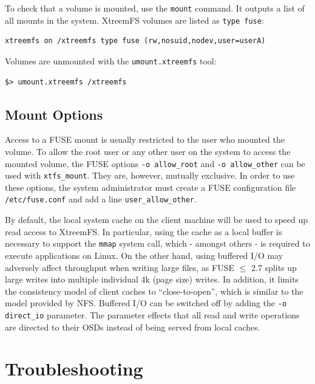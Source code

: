 \documentclass[a4paper,10pt]{book}
\begin{document}
To check that a volume is mounted, use the \texttt{mount} command. It outputs a list of all mounts in the system. XtreemFS volumes are listed as \texttt{type fuse}:

\begin{verbatim}
xtreemfs on /xtreemfs type fuse (rw,nosuid,nodev,user=userA)
\end{verbatim}

Volumes are unmounted with the \texttt{umount.xtreemfs} tool:

\begin{verbatim}
$> umount.xtreemfs /xtreemfs
\end{verbatim}

\subsection{Mount Options}

Access to a FUSE mount is usually restricted to the user who mounted the volume. To allow the root user or any other user on the system to access the mounted volume, the FUSE options \texttt{-o allow\_root} and \texttt{-o allow\_other} can be used with \texttt{xtfs\_mount}. They are, however, mutually exclusive. In order to use these options, the system administrator must create a FUSE configuration file \texttt{/etc/fuse.conf} and add a line \texttt{user\_allow\_other}.

By default, the local system cache on the client machine will be used to speed up read access to XtreemFS. In particular, using the cache as a local buffer is necessary to support the \texttt{mmap} system call, which - amongst others - is required to execute applications on Linux. On the other hand, using buffered I/O may adversely affect throughput when writing large files, as FUSE $\leq$ 2.7 splits up large writes into multiple individual 4k (page size) writes. In addition, it limits the consistency model of client caches to ``close-to-open'', which is similar to the model provided by NFS. Buffered I/O can be switched off by adding the \texttt{-o direct\_io} parameter. The parameter effects that all read and write operations are directed to their OSDs instead of being served from local caches.


\section{Troubleshooting}
\end{document}
